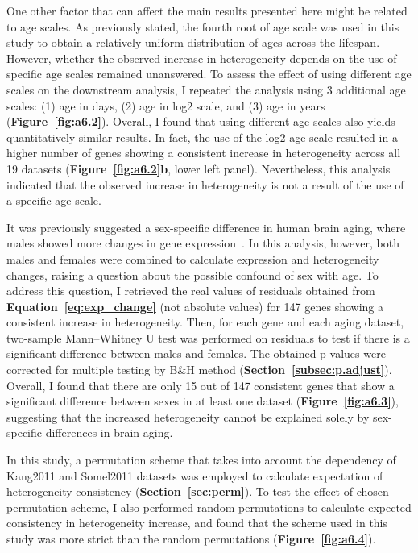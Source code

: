 One other factor that can affect the main results presented here might be related to age scales.
As previously stated, the fourth root of age scale was used in this study to obtain a relatively uniform distribution of ages across the lifespan.
However, whether the observed increase in heterogeneity depends on the use of specific age scales remained unanswered.
To assess the effect of using different age scales on the downstream analysis, I repeated the analysis using 3 additional age scales: 
(1) age in days, (2) age in log2 scale, and (3) age in years (\textbf{Figure~\ref{fig:a6.2}}).
Overall, I found that using different age scales also yields quantitatively similar results.
In fact, the use of the log2 age scale resulted in a higher number of genes showing a consistent increase in heterogeneity across all 19 datasets (\textbf{Figure~\ref{fig:a6.2}b}, lower left panel).
Nevertheless, this analysis indicated that the observed increase in heterogeneity is not a result of the use of a specific age scale.

It was previously suggested a sex-specific difference in human brain aging, where males showed more changes in gene expression~\autocite{Berchtold2008}.
In this analysis, however, both males and females were combined to calculate expression and heterogeneity changes, raising a question about the possible confound of sex with age.
To address this question, I retrieved the real values of residuals obtained from \textbf{Equation~\ref{eq:exp_change}} 
(not absolute values) for 147 genes showing a consistent increase in heterogeneity.
Then, for each gene and each aging dataset, two-sample Mann–Whitney U test was performed on residuals to test if there is a significant difference between males and females.
The obtained p-values were corrected for multiple testing by B{\&}H method (\textbf{Section~\ref{subsec:p.adjust}}).
Overall, I found that there are only 15 out of 147 consistent genes that show a significant difference between sexes in at least one dataset (\textbf{Figure~\ref{fig:a6.3}}),
suggesting that the increased heterogeneity cannot be explained solely by sex-specific differences in brain aging.

In this study, a permutation scheme that takes into account the dependency of Kang2011 and Somel2011 
datasets was employed to calculate expectation of heterogeneity consistency (\textbf{Section~\ref{sec:perm}}).
To test the effect of chosen permutation scheme, I also performed random permutations to calculate expected consistency in heterogeneity increase, 
and found that the scheme used in this study was more strict than the random permutations (\textbf{Figure~\ref{fig:a6.4}}).

